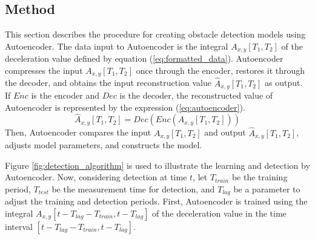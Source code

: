 \documentclass[paper]{ieice}
\begin{document}
\subsection{Method}
\label{sec:method}
%
This section describes the procedure for creating obstacle detection models using Autoencoder.
%
The data input to Autoencoder is the integral $A_{x,y}[T_1,T_2]$ of the deceleration value defined by equation (\ref{eq:formatted_data}).
%
Autoencoder compresses the input $A_{x,y}[T_1,T_2]$ once through the encoder, restores it through the decoder, and obtains the input reconstruction value $\hat{A}_{x, y}[T_1,T_2]$ as output.
%
If $Enc$ is the encoder and $Dec$ is the decoder, the reconstructed value of Autoencoder is represented by the expression (\ref{eq:autoencoder}).
%
\begin{equation}
  \label{eq:autoencoder}
  \hat{A}_{x, y}\left[T_1, T_2\right]=Dec\left(Enc\left(A_{x, y}\left[T_1, T_2\right]\right)\right)
\end{equation}
%
%
Then, Autoencoder compares the input $A_{x, y}[T_1,T_2]$ and output $\hat{A}_{x, y}[T_1,T_2]$, adjusts model parameters, and constructs the model.
%
\par
%
Figure \ref{fig:detection_algorithm} is used to illustrate the learning and detection by Autoencoder.
%
Now, considering detection at time $t$, let $T_{train}$ be the training period, $T_{test}$ be the measurement time for detection, and $T_{lag}$ be a parameter to adjust the training and detection periods.
%
First, Autoencoder is trained using the integral $A_{x,y}[t-T_{lag}-T_{train},t-T_{lag}]$ of the deceleration value in the time interval $[t-T_{lag}-T_{train},t-T_{lag}]$.
%
\end{document}
